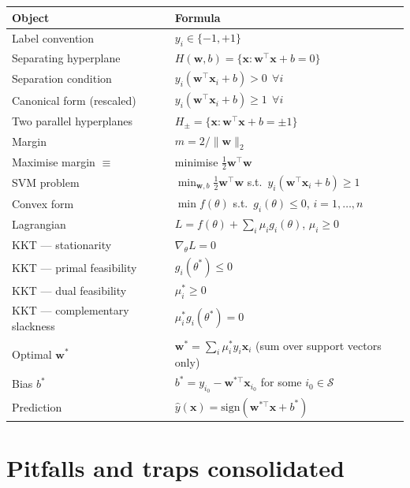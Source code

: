 \documentclass[11pt, a4paper]{article}
\newcommand{\thead}[1]{\textbf{#1}}
\begin{document}
\begin{tabularx}{\linewidth}{@{}lX@{}}
\toprule
\thead{Object} & \thead{Formula} \\
\midrule
Label convention            & $y_i \in \{-1, +1\}$ \\
Separating hyperplane       & $H(\mathbf{w}, b) = \{\mathbf{x} : \mathbf{w}^\top\mathbf{x} + b = 0\}$ \\
Separation condition        & $y_i(\mathbf{w}^\top\mathbf{x}_i + b) > 0\,\;\forall i$ \\
Canonical form (rescaled)   & $y_i(\mathbf{w}^\top\mathbf{x}_i + b) \ge 1\,\;\forall i$ \\
Two parallel hyperplanes    & $H_\pm = \{\mathbf{x} : \mathbf{w}^\top\mathbf{x} + b = \pm 1\}$ \\
Margin                      & $m = 2/\|\mathbf{w}\|_2$ \\
Maximise margin $\equiv$    & minimise $\tfrac{1}{2}\mathbf{w}^\top\mathbf{w}$ \\
SVM problem                 & $\min_{\mathbf{w}, b} \tfrac{1}{2}\mathbf{w}^\top\mathbf{w}$ s.t.\ $y_i(\mathbf{w}^\top\mathbf{x}_i + b) \ge 1$ \\
Convex form                 & $\min f(\theta)$ s.t.\ $g_i(\theta) \le 0$, $i = 1, \ldots, n$ \\
Lagrangian                  & $L = f(\theta) + \sum_i \mu_i g_i(\theta)$, $\mu_i \ge 0$ \\
KKT — stationarity          & $\nabla_\theta L = 0$ \\
KKT — primal feasibility    & $g_i(\theta^*) \le 0$ \\
KKT — dual feasibility      & $\mu_i^* \ge 0$ \\
KKT — complementary slackness & $\mu_i^* g_i(\theta^*) = 0$ \\
Optimal $\mathbf{w}^*$       & $\mathbf{w}^* = \sum_i \mu_i^* y_i \mathbf{x}_i$ (sum over support vectors only) \\
Bias $b^*$                  & $b^* = y_{i_0} - \mathbf{w}^{*\top}\mathbf{x}_{i_0}$ for some $i_0 \in \mathcal{S}$ \\
Prediction                  & $\hat y(\mathbf{x}) = \mathrm{sign}(\mathbf{w}^{*\top}\mathbf{x} + b^*)$ \\
\bottomrule
\end{tabularx}

\section*{Pitfalls and traps consolidated}
\end{document}
